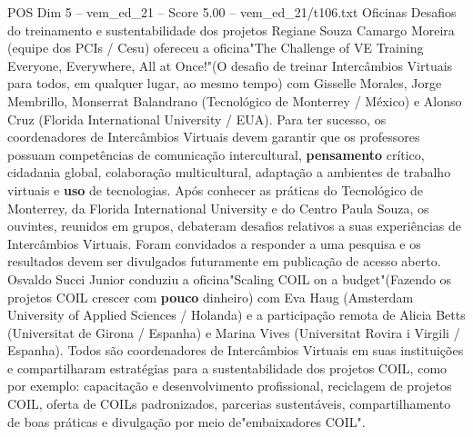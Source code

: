 \begin{textsample}{POS Dim 5 – vem\_ed\_21 – Score 5.00 – vem\_ed\_21/t106.txt}  \label{ex:f5_pos_086}
Oficinas Desafios do treinamento e sustentabilidade dos projetos Regiane Souza Camargo Moreira (equipe dos PCIs / Cesu) ofereceu a oficina"The Challenge of VE Training Everyone, Everywhere, All at Once!"(O desafio de treinar Intercâmbios Virtuais para todos, em qualquer lugar, ao mesmo tempo) com Gisselle Morales, Jorge Membrillo, Monserrat Balandrano (Tecnológico de Monterrey / México) e Alonso Cruz (Florida International University / EUA).
Para ter sucesso, os coordenadores de Intercâmbios Virtuais devem garantir que os professores possuam competências de comunicação intercultural, \textbf{pensamento} crítico, cidadania global, colaboração multicultural, adaptação a ambientes de trabalho virtuais e \textbf{uso} de tecnologias.
Após conhecer as práticas do Tecnológico de Monterrey, da Florida International University e do Centro Paula Souza, os ouvintes, reunidos em grupos, debateram desafios relativos a suas experiências de Intercâmbios Virtuais.
Foram convidados a responder a uma pesquisa e os resultados devem ser divulgados futuramente em publicação de acesso aberto.
Osvaldo Succi Junior conduziu a oficina"Scaling COIL on a budget"(Fazendo os projetos COIL crescer com \textbf{pouco} dinheiro) com Eva Haug (Amsterdam University of Applied Sciences / Holanda) e a participação remota de Alicia Betts (Universitat de Girona / Espanha) e Marina Vives (Universitat Rovira i Virgili / Espanha).
Todos são coordenadores de Intercâmbios Virtuais em suas instituições e compartilharam estratégias para a sustentabilidade dos projetos COIL, como por exemplo: capacitação e desenvolvimento profissional, reciclagem de projetos COIL, oferta de COILs padronizados, parcerias sustentáveis, compartilhamento de boas práticas e divulgação por meio de"embaixadores COIL".

\end{textsample}
